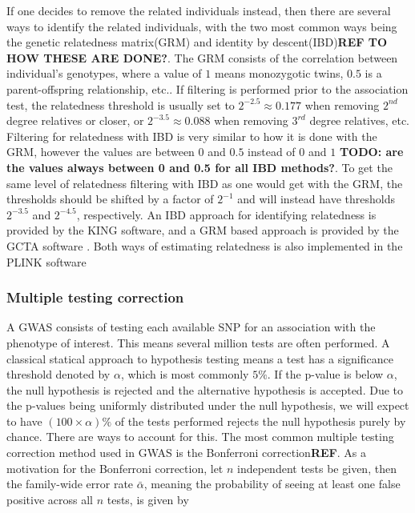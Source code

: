 If one decides to remove the related individuals instead, then there are several ways to identify the related individuals, with the two most common ways being the genetic relatedness matrix(GRM) and identity by descent(IBD)\textbf{REF TO HOW THESE ARE DONE?}. The GRM consists of the correlation between individual's genotypes, where a value of $ 1 $ means monozygotic twins, $ 0.5 $ is a parent-offspring relationship, etc.. If filtering is performed prior to the association test, the relatedness threshold is usually set to $ 2^{-2.5} \approx 0.177 $ when removing $ 2^{nd} $ degree relatives or closer, or $ 2^{-3.5} \approx 0.088 $ when removing $ 3^{rd} $ degree relatives, etc. Filtering for relatedness with IBD is very similar to how it is done with the GRM, however the values are between $ 0 $ and $ 0.5 $ instead of $ 0 $ and $ 1 $ \textbf{TODO: are the values always between 0 and 0.5 for all IBD methods?}. To get the same level of relatedness filtering with IBD as one would get with the GRM, the thresholds should be shifted by a factor of $ 2^{-1} $ and will instead have thresholds $ 2^{-3.5} $ and $ 2^{-4.5} $, respectively. An IBD approach for identifying relatedness is provided by the KING software\cite{manichaikul2010robust}, and a GRM based approach is provided by the GCTA software \cite{yang2011gcta}. Both ways of estimating relatedness is also implemented in the PLINK software\cite{chang2015second,purcell2007plink}


\subsubsection{Multiple testing correction}
A GWAS consists of testing each available SNP for an association with the phenotype of interest. This means several million tests are often performed. A classical statical approach to hypothesis testing means a test has a significance threshold denoted by $ \alpha $, which is most commonly $ 5\% $. If the p-value is below $ \alpha $, the null hypothesis is rejected and the alternative hypothesis is accepted. Due to the p-values being uniformly distributed under the null hypothesis, we will expect to have $ (100\times \alpha) \%$ of the tests performed rejects the null hypothesis purely by chance. There are ways to account for this. The most common multiple testing correction method used in GWAS is the Bonferroni correction\textbf{REF}. As a motivation for the Bonferroni correction, let $ n $ independent tests be given, then the family-wide error rate $ \bar{\alpha} $, meaning the probability of seeing at least one false positive across all $ n $ tests, is given by


